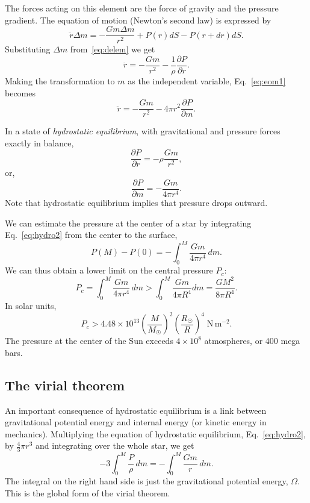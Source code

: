 \documentclass[10pt,amsmath,amssymb,aps,pra]{revtex4-2}
\newcommand{\unit}[1]{\;\mathrm{#1}}
\newcommand{\Sun}{\astrosun}
\newcommand{\di}{\partial} %
\begin{document}
The forces acting on this element are the force of gravity and the pressure
gradient. The equation of motion (Newton's second law) is expressed by
\begin{equation}
\ddot{r}\Delta{m} = -\frac{Gm\Delta{m}}{r^2} + P(r)dS - P(r+dr)dS.
\end{equation}
Substituting $\Delta{m}$ from~\eqref{eq:delem} we get
\begin{equation}\label{eq:eom1}
\ddot{r} = -\frac{Gm}{r^2} - \frac{1}{\rho}\frac{\di{P}}{\di{r}}.
\end{equation}
Making the transformation to $m$ as the independent variable,
Eq.~\eqref{eq:eom1} becomes
\begin{equation}\label{eq:eom2}
\ddot{r} = -\frac{Gm}{r^2} - 4\pi{r}^2\frac{\di{P}}{\di{m}}.
\end{equation}

In a state of \emph{hydrostatic equilibrium}, with gravitational and pressure
forces exactly in balance,
\begin{equation}
\frac{\di{P}}{\di{r}} = -\rho\frac{Gm}{r^2},
\end{equation}
or,
\begin{equation}\label{eq:hydro2}
\frac{\di{P}}{\di{m}} = -\frac{Gm}{4\pi{r}^4}.
\end{equation}
Note that hydrostatic equilibrium implies that pressure drops outward.

We can estimate the pressure at the center of a star by integrating
Eq.~\eqref{eq:hydro2} from the center to the surface,
\begin{equation}
P(M) - P(0) = -\int_0^M\frac{Gm}{4\pi{r}^4}\,dm.
\end{equation}
We can thus obtain a lower limit on the central pressure $P_c$:
\begin{equation}
P_c = \int_0^M\frac{Gm}{4\pi{r}^4}\,dm>\int_0^M\frac{Gm}{4\pi{R}^4}dm =
\frac{GM^2}{8\pi{R}^4}.
\end{equation}
In solar units,
\begin{equation}
P_c > 4.48\times10^{13}\left(\frac{M}{M_{\Sun}}\right)^2\left(\frac{R_{\Sun}}
{R}\right)^4\unit{N\,m^{-2}}.
\end{equation}
The pressure at the center of the Sun exceeds $4\times10^8$ atmospheres, or 400
mega bars.

\subsection{The virial theorem}
An important consequence of hydrostatic equilibrium is a link between
gravitational potential energy and internal energy (or kinetic energy in
mechanics). Multiplying the equation of hydrostatic equilibrium,
Eq.~\eqref{eq:hydro2}, by $\frac{4}{3}\pi{r}^3$ and integrating over the whole
star, we get
\begin{equation}\label{eq:virial}
-3\int_0^M\frac{P}{\rho}\,dm = -\int_0^M\frac{Gm}{r}\,dm.
\end{equation}
The integral on the right hand side is just the gravitational potential energy,
$\Omega$. This is the global form of the virial theorem.
\end{document}

